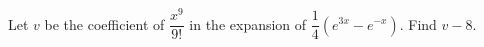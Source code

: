 Let $v$ be the coefficient of $\dfrac{x^9}{9!}$ in the expansion of $\dfrac14\left(e^{3x}-e^{-x}\right)$. Find $v-8$.
